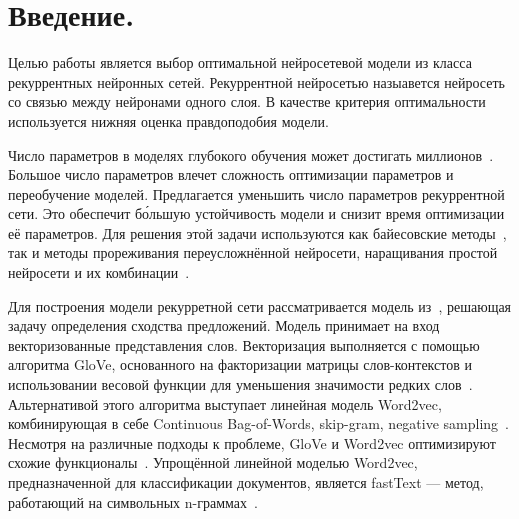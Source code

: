 \documentclass[12pt, fleqn, unicode]{article}
\begin{document}
\newpage

\section{Введение.}
Целью работы является выбор оптимальной нейросетевой модели  из класса рекуррентных нейронных сетей. Рекуррентной нейросетью назыавется нейросеть со связью между нейронами одного слоя. В качестве критерия оптимальности используется нижняя оценка правдоподобия модели. 

Число параметров в моделях глубокого обучения может достигать миллионов~\cite{DeepGoogle}. Большое число параметров влечет сложность оптимизации параметров и переобучение моделей\cite{Bishop}. Предлагается уменьшить число параметров рекуррентной сети. Это обеспечит б\'{о}льшую устойчивость модели и снизит время оптимизации её параметров. Для решения этой задачи используются как байесовские методы~\cite{Strijov_1}, так и методы прореживания переусложнённой нейросети, наращивания простой нейросети и их комбинации~\cite{Strijov_2}.

Для построения модели рекурретной сети рассматривается модель из~\cite{Sanborn}, решающая задачу определения сходства предложений.
Модель принимает на вход векторизованные представления слов. Векторизация выполняется с помощью алгоритма GloVe, основанного на факторизации матрицы слов-контекстов и использовании весовой функции для уменьшения значимости редких слов~\cite{GloVe}. Альтернативой этого алгоритма выступает линейная модель Word2vec, комбинирующая в себе Continuous Bag-of-Words, skip-gram, negative sampling~\cite{word2vec}. Несмотря на различные подходы к проблеме, GloVe и Word2vec оптимизируют схожие функционалы~\cite{Glo2vec}. Упрощённой линейной моделью Word2vec, предназначенной для классификации документов, является fastText --- метод, работающий на символьных n-граммах~\cite{fastText}. 

\end{document}
